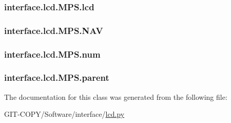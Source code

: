 \subsubsection[{lcd}]{\setlength{\rightskip}{0pt plus 5cm}interface.\+lcd.\+M\+P\+S.\+lcd}\label{classinterface_1_1lcd_1_1MPS_ac3601f1dd283764baca481f596f6ca40}
\hypertarget{classinterface_1_1lcd_1_1MPS_a128ad75cc77e06e9621cb8a8d2e4a6e7}{}
\subsubsection[{N\+A\+V}]{\setlength{\rightskip}{0pt plus 5cm}interface.\+lcd.\+M\+P\+S.\+N\+A\+V}\label{classinterface_1_1lcd_1_1MPS_a128ad75cc77e06e9621cb8a8d2e4a6e7}
\hypertarget{classinterface_1_1lcd_1_1MPS_a698ac3f1e12c9d6c893c135d06252f66}{}
\subsubsection[{num}]{\setlength{\rightskip}{0pt plus 5cm}interface.\+lcd.\+M\+P\+S.\+num}\label{classinterface_1_1lcd_1_1MPS_a698ac3f1e12c9d6c893c135d06252f66}
\hypertarget{classinterface_1_1lcd_1_1MPS_a1d739a8338d7a795b4efa322d08f2808}{}
\subsubsection[{parent}]{\setlength{\rightskip}{0pt plus 5cm}interface.\+lcd.\+M\+P\+S.\+parent}\label{classinterface_1_1lcd_1_1MPS_a1d739a8338d7a795b4efa322d08f2808}


The documentation for this class was generated from the following file\+:\begin{DoxyCompactItemize}
\item 
G\+I\+T-\/\+C\+O\+P\+Y/\+Software/interface/\hyperlink{GIT-COPY_2Software_2interface_2lcd_8py}{lcd.\+py}\end{DoxyCompactItemize}
